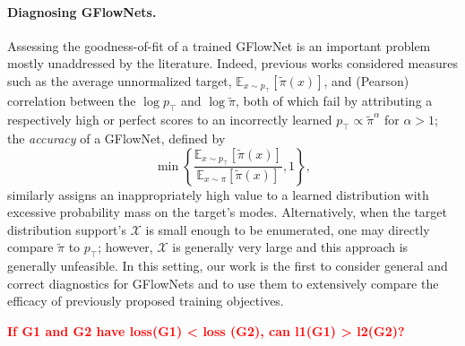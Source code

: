 \documentclass{article}
\theoremstyle{plain}
\theoremstyle{definition}
\theoremstyle{remark}
\theoremstyle{remark}
\begin{document}



\paragraph{Diagnosing GFlowNets.} Assessing the goodness-of-fit of a trained GFlowNet is an important problem mostly unaddressed by the literature. Indeed, previous works considered measures such as the average unnormalized target, $\mathbb{E}_{x \sim p_{\intercal}}[\tilde{\pi}(x)]$, and (Pearson) correlation between the $\log p_{\intercal}$ and $\log \tilde{\pi}$, both of which fail by attributing a respectively high or perfect scores to an incorrectly learned $p_{\intercal} \propto \tilde{\pi}^{\alpha}$ for $\alpha > 1$; the \textit{accuracy} of a GFlowNet, defined by 
\begin{equation}
    \min \left\{ \frac{\mathbb{E}_{x \sim p_{\intercal}}\left[ \tilde{\pi}(x) \right]}{\mathbb{E}_{x \sim \pi} \left[ \tilde{\pi}(x) \right]}, 1 \right\}, 
\end{equation}
similarly assigns an inappropriately high value to a learned distribution with excessive probability mass on the target's modes. Alternatively, when the target distribution support's $\mathcal{X}$ is small enough to be enumerated, one may directly compare $\tilde{\pi}$ to $p_{\intercal}$; however, $\mathcal{X}$ is generally very large and this approach is generally unfeasible. In this setting, our work is the first to consider general and correct diagnostics for GFlowNets and to use them to extensively compare the efficacy of previously proposed training objectives.  


\textcolor{red}{\bf If G1 and G2 have loss(G1) < loss (G2), can l1(G1) > l2(G2)?}


\end{document}
